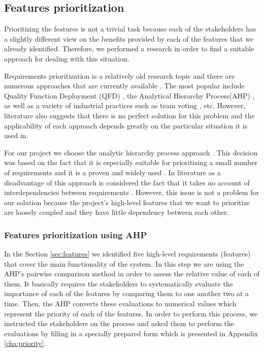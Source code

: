 \subsection{Features prioritization}

Prioritizing the features is not a trivial task because each of the stakeholders has a slightly different view on the benefits provided by each of the features that we already identified. Therefore, we performed a research in order to find a suitable approach for dealing with this situation.

Requirements prioritization is a relatively old research topic and there are numerous approaches that are currently available \cite{moisiadis2002fundamentals}. The most popular include Quality Function Deployment (QFD) \cite{chan2002quality}, the Analytical Hierarchy Process(AHP) \cite{roper1990analytic} , as well as a variety of industrial practices such as team voting \cite{moisiadis2002fundamentals}, etc. However, literature also suggests that there is no perfect solution for this problem and the applicability of each approach depends greatly on the particular situation it is used in.

For our project we choose the analytic hierarchy process approach \cite{roper1990analytic}. This decision was based on the fact that it is especially suitable for prioritizing a small number of requirements\cite{karlsson1997cost} and it is a proven and widely used \cite{karlsson1998evaluation}. In literature as a disadvantage of this approach is considered the fact that it takes no account of interdependencies between requirements \cite{roper1990analytic}. However, this issue is not a problem for our solution because the project's high-level features that we want to prioritize are loosely coupled and they have little dependency between each other. 


\subsubsection{Features prioritization using AHP}
In the Section \ref{sec:features} we identified five high-level requirements (features) that cover the main functionality of the system. In this step we are using the AHP's pairwise comparison method in order to assess the relative value of each of them. It basically requires the stakeholders to systematically evaluate the importance of each of the features by comparing them to one another two at a time. Then, the AHP converts these evaluations to numerical values which represent the priority of each of the features. In order to perform this process, we instructed the stakeholders on the process and asked them to perform the evaluations by filling in a specially prepared form which is presented in Appendix \ref{cha:priority}.

